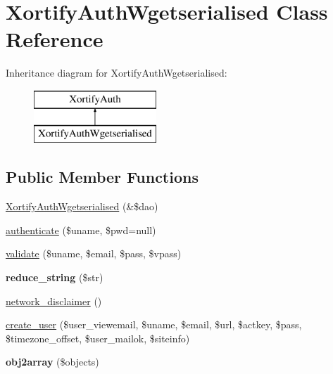 \hypertarget{class_xortify_auth_wgetserialised}{\section{Xortify\-Auth\-Wgetserialised Class Reference}
\label{class_xortify_auth_wgetserialised}
}
Inheritance diagram for Xortify\-Auth\-Wgetserialised\-:\begin{figure}[H]
\begin{center}
\leavevmode
\includegraphics[height=2.000000cm]{class_xortify_auth_wgetserialised}
\end{center}
\end{figure}
\subsection*{Public Member Functions}
\begin{DoxyCompactItemize}
\item 
\hyperlink{class_xortify_auth_wgetserialised_a19d9ff68c2898f6cbc6a7246113ffcce}{Xortify\-Auth\-Wgetserialised} (\&\$dao)
\item 
\hyperlink{class_xortify_auth_wgetserialised_af2fa58d0e05bc6cd754f9f4c8ea9c976}{authenticate} (\$uname, \$pwd=null)
\item 
\hyperlink{class_xortify_auth_wgetserialised_a21e92ca1d323054ad3cae1e038ce7d4a}{validate} (\$uname, \$email, \$pass, \$vpass)
\item 
\hypertarget{class_xortify_auth_wgetserialised_ac3632b4fbd4f6fb2797c5d1544ff2937}{{\bfseries reduce\-\_\-string} (\$str)}\label{class_xortify_auth_wgetserialised_ac3632b4fbd4f6fb2797c5d1544ff2937}

\item 
\hyperlink{class_xortify_auth_wgetserialised_a6c0fe452feecff1b9c6db22e42523284}{network\-\_\-disclaimer} ()
\item 
\hyperlink{class_xortify_auth_wgetserialised_ab3c21fae6f3bcbfcdeb243a54f1944f2}{create\-\_\-user} (\$user\-\_\-viewemail, \$uname, \$email, \$url, \$actkey, \$pass, \$timezone\-\_\-offset, \$user\-\_\-mailok, \$siteinfo)
\item 
\hypertarget{class_xortify_auth_wgetserialised_abd1991405b85be676af4693902d4e398}{{\bfseries obj2array} (\$objects)}\label{class_xortify_auth_wgetserialised_abd1991405b85be676af4693902d4e398}

\end{DoxyCompactItemize}
